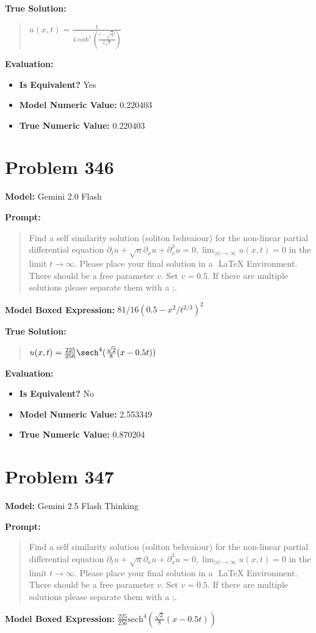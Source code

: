 \documentclass{article}
\begin{document}
{\textbf{True Solution:}
\begin{quote}
$u(x, t) = \frac{1}{4\cosh^2(\frac{x-\sqrt{\frac{3}{2}}t}{2\sqrt{2}})}$
\end{quote}

\textbf{Evaluation:}
\begin{itemize}
\item \textbf{Is Equivalent?} Yes
\item \textbf{Model Numeric Value:} 0.220403
\item \textbf{True Numeric Value:} 0.220403
\end{itemize}
\vspace{1cm}
\section*{Problem 346}
\textbf{Model:} Gemini 2.0 Flash

\textbf{Prompt:}
\begin{quote}
Find a self similarity solution (soliton behvaiour) for the non-linear partial differential equation $\partial_t u +\sqrt{u}\partial_x u + \partial_x^3 u=0, \lim_{|x|\to\infty} u(x,t)=0$ in the limit $t\rightarrow\infty$. Please place your final solution in a $\boxed{}$ LaTeX Environment. There should be a free parameter $v$. Set $v=0.5$. If there are multiple solutions please separate them with a ;.
\end{quote}
\textbf{Model Boxed Expression:} $81/16 (0.5 - x^2/t^{2/3})^2$

\textbf{True Solution:}
\begin{quote}
$u(x,t) = \frac{225}{256} \sech^4( \frac{\sqrt{2}}{8} (x - 0.5t) )$
\end{quote}

\textbf{Evaluation:}
\begin{itemize}
\item \textbf{Is Equivalent?} No
\item \textbf{Model Numeric Value:} 2.553349
\item \textbf{True Numeric Value:} 0.870204
\end{itemize}
\vspace{1cm}
\section*{Problem 347}
\textbf{Model:} Gemini 2.5 Flash Thinking

\textbf{Prompt:}
\begin{quote}
Find a self similarity solution (soliton behvaiour) for the non-linear partial differential equation $\partial_t u +\sqrt{u}\partial_x u + \partial_x^3 u=0, \lim_{|x|\to\infty} u(x,t)=0$ in the limit $t\rightarrow\infty$. Please place your final solution in a $\boxed{}$ LaTeX Environment. There should be a free parameter $v$. Set $v=0.5$. If there are multiple solutions please separate them with a ;.
\end{quote}
\textbf{Model Boxed Expression:} $\frac{225}{256} \text{sech}^4\left(\frac{\sqrt{2}}{8}(x-0.5t)\right)$

}
\end{document}
